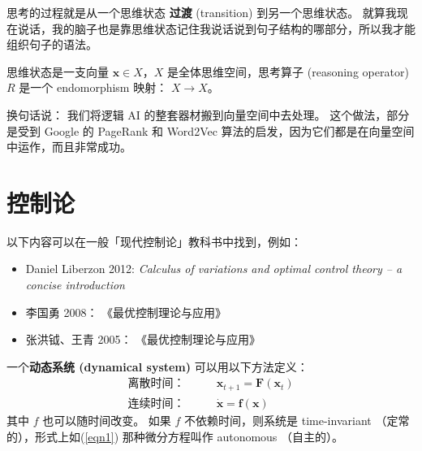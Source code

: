 \documentclass[orivec]{llncs}
\newcommand{\emp}[1]{\textbf{\textcolor{Cerulean}{#1}}}
\newcommand{\vect}[1]{\boldsymbol{#1}}
\begin{document}
思考的过程就是从一个思维状态 \emp{过渡} (transition) 到另一个思维状态。 就算我现在说话，我的脑子也是靠思维状态记住我说话说到句子结构的哪部分，所以我才能组织句子的语法。

思维状态是一支向量 $\vect{x} \in X$，$X$ 是全体思维空间，思考算子 (reasoning operator) $R$ 是一个 endomorphism 映射： $X \rightarrow X$。



换句话说： 我们将逻辑 AI 的整套器材搬到向量空间中去处理。 这个做法，部分是受到 Google 的 PageRank 和 Word2Vec \cite{Mikolov2013} 算法的启发，因为它们都是在向量空间中运作，而且非常成功。 %

\section{控制论}

以下内容可以在一般「现代控制论」教科书中找到，例如：
\let\labelitemi\labelitemii
\begin{itemize}
\item Daniel Liberzon 2012: \textit{Calculus of variations and optimal control theory -- a concise introduction}
\item 李国勇 2008： 《最优控制理论与应用》
\item 张洪钺、王青 2005： 《最优控制理论与应用》
\end{itemize}

一个\emp{动态系统 (dynamical system)} 可以用以下方法定义：
\begin{eqnarray}
\mbox{离散时间：} \quad \quad & \vect{x}_{t+1} = \vect{F}(\vect{x}_t) \\
\mbox{连续时间：} \quad \quad & \dot{\vect{x}} = \vect{f}(\vect{x}) \label{eqn1}
\end{eqnarray}
其中 $f$ 也可以随时间改变。 如果 $f$ 不依赖时间，则系统是 time-invariant （定常的），形式上如(\ref{eqn1}) 那种微分方程叫作 autonomous （自主的）。
\end{document}
